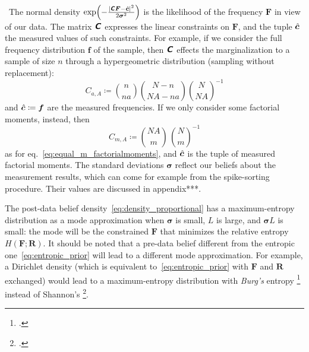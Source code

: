 \documentclass[\ifafour a4paper,12pt,\else a5paper,10pt,\fi%
onecolumn,oneside,article,%
british%
]{memoir}
\theoremstyle{remark}
\theoremstyle{innote}
\newcommand*{\mathte}[1]{\textbf{\textit{\textsf{#1}}}}
\newcommand*{\citep}{\footcites}
\newcommand*{\defd}{\coloneqq}
\DeclarePairedDelimiter\abs{\lvert}{\rvert}
\renewcommand*{\|}[1][]{\nonscript\,#1\vert\nonscript\;\mathopen{}}
\newcommand*{\eqn}{eq.}%
\newcommand*{\yAv}{A}
\newcommand*{\yav}{a}
\newcommand*{\yNv}{N}
\newcommand*{\yFF}{F}
\newcommand*{\yff}{f}
\newcommand*{\yF}{\bm{\yFF}}
\newcommand*{\yf}{\bm{\yff}}
\newcommand*{\ya}{\yav}%
\newcommand*{\yA}{\yAv}%
\newcommand*{\yc}{\Hat{\bm{c}}}
\newcommand*{\ysh}{H}
\newcommand*{\yRR}{R}
\newcommand*{\yR}{\bm{\yRR}}
\newcommand*{\ycmm}{C}
\newcommand*{\ycm}{\mathte{\ycmm}}
\newcommand*{\ycs}{\bm{\sigma}}
\newcommand*{\yL}{L}
\begin{document}
\textbullet\ The normal density
$\exp\Bigl(-\frac{\abs{\ycm\yF - \yc}^{2}}{2\ycs^{2}}\Bigr)$ is the
likelihood of the frequency $\yF$ in view of our data. The matrix $\ycm$
expresses the linear constraints on $\yF$, and the tuple $\yc$ the measured
values of such constraints. For example, if we consider the full frequency
distribution $\yf$ of the sample, then $\ycm$ effects the marginalization
to a sample of size $n$ through a hypergeometric distribution (sampling
without replacement):
\begin{equation}
  \label{eq:constraint_hypergeometric}
\ycmm_{\ya,\yA} \defd
  \binom{n}{n\ya}\binom{\yNv-n}{\yNv \yA-n\ya}\binom{\yNv}{\yNv \yA}^{-1}
\end{equation}
and $\yc \defd \yf$ are the measured frequencies. If we only consider some
factorial moments, instead, then
\begin{equation}
  \label{eq:constraint_hypergeometric}
  \ycmm_{m,\yA} \defd
  \binom{N \yA}{m}\,  \binom{N}{m}^{-1}
\end{equation}
as for \eqn~\eqref{eq:equal_m_factorialmoments}, and $\yc$ is the tuple of
measured factorial moments. The standard deviations $\ycs$ reflect our
beliefs about the measurement results, which can come for example from
the spike-sorting procedure. Their values are discussed in appendix***.

\bigskip

The post-data belief density~\eqref{eq:density_proportional} has a
maximum-entropy distribution as a mode approximation when $\ycs$ is small,
$\yL$ is large, and $\ycs L$ is small: the mode will be the constrained
$\yF$ that minimizes the relative entropy $\ysh(\yF;\yR)$. It should be
noted that a pre-data belief different from the entropic
one~\eqref{eq:entropic_prior} will lead to a different mode approximation.
For example, a Dirichlet density (which is equivalent
to~\eqref{eq:entropic_prior} with $\yF$ and $\yR$ exchanged) would lead to
a maximum-entropy distribution with \emph{Burg's} entropy \citep{burg1975}
instead of Shannon's \citep{jaynes1986d_r1996,portamana2009}.


\bigskip
\end{document}
